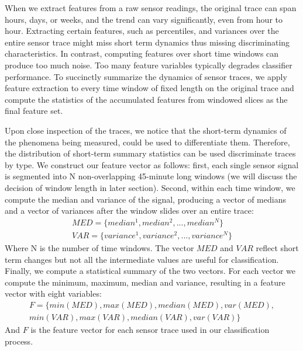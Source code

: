When we extract features from a raw sensor readings, the original trace can span hours, days, or weeks, and
the trend can vary significantly, even from hour to hour. Extracting certain features, such as percentiles, and
variances over the entire sensor trace might miss  short term dynamics thus missing discriminating characteristics.
In contrast, computing features over short time windows can produce too much noise.  Too many  feature variables typically 
degrades classifier performance.
To succinctly summarize the dynamics of sensor traces, we apply feature extraction to every time window of fixed length on 
the original trace and compute the statistics of the accumulated features from windowed slices as the final feature set. 

Upon close inspection of the traces, we notice that the short-term dynamics of the phenomena being measured, could be used
to differentiate them.  Therefore, the distribution of short-term summary statistics can be used discriminate
traces by type.  We construct our feature vector as follows: first,
each single sensor signal is segmented into N
non-overlapping 45-minute long windows (we will discuss the decision of window length in later section). Second, within
each time window, we compute the median and variance of the signal, producing a vector of medians and a vector of
variances after the window slides over an entire trace: 
\begin{displaymath}
\begin{split}
MED = \{median^{1}, median^{2}, ..., median^{N}\}\\
VAR = \{variance^{1}, variance^{2}, ..., variance^{N}\}
\end{split}
\end{displaymath}
Where N is the number of time windows. The vector $MED$ and $VAR$ reflect short term changes but not all the intermediate values are useful for classification. Finally, we compute a statistical summary of the two vectors.   For each vector we compute the minimum, maximum, median and variance, resulting in a feature vector with eight variables:
\begin{displaymath}
\begin{split}
F = \{min(MED), max(MED), median(MED), var(MED),\\
 min(VAR), max(VAR), median(VAR), var(VAR)\}
\end{split}
\end{displaymath}
And $F$ is the feature vector for each sensor trace used in our classification process.

